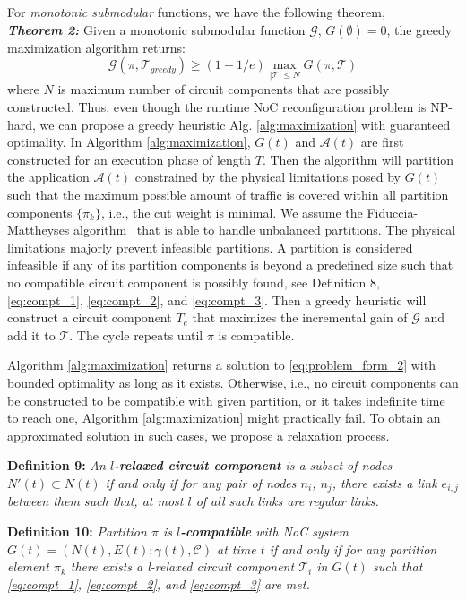 {{\noindent For \textit{monotonic submodular} functions\cite{nemhauser1978best}, we have the following theorem,\\
\textbf{\textit{Theorem 2:}} 
Given a monotonic submodular function $\mathcal G$, $G(\emptyset)=0$, the greedy maximization algorithm returns:
\begin{equation}\label{eq:max}
 \mathcal G(\pi, \mathcal T_{greedy}) \geq (1-1/e) \max\limits_{|\mathcal T|\leq N}G(\pi,\mathcal T)
\end{equation}
where $N$ is maximum number of circuit components that are possibly constructed. Thus, even though the runtime NoC reconfiguration problem is NP-hard, we can propose a greedy heuristic Alg. \ref{alg:maximization} with guaranteed optimality. In Algorithm \ref{alg:maximization}, $G(t)$ and $\mathcal A(t)$ are first constructed for an execution phase of length $T$. Then the algorithm will partition the application $\mathcal A(t)$ constrained by the physical limitations posed by $G(t)$ such that the maximum possible amount of traffic is covered within all partition components $\{\pi_{k}\}$, i.e., the cut weight is minimal. We assume the Fiduccia-Mattheyses algorithm~\cite{fiduccia1982linear} that is able to handle unbalanced partitions. The physical limitations majorly prevent infeasible partitions. A partition is considered infeasible if any of its partition components is beyond a predefined size such that no compatible circuit component is possibly found, see Definition 8, \eqref{eq:compt_1}, \eqref{eq:compt_2}, and \eqref{eq:compt_3}. Then a greedy heuristic will construct a circuit component $T_{e}$ that maximizes the incremental gain of $\mathcal G$ and add it to $\mathcal T$. The cycle repeats until $\pi$ is compatible. 

Algorithm \ref{alg:maximization} returns a solution to \eqref{eq:problem_form_2} with bounded optimality as long as it exists. Otherwise, i.e., no circuit components can be constructed to be compatible with given partition, or it takes indefinite time to reach one, Algorithm \ref{alg:maximization} might practically fail. To obtain an approximated solution in such cases, we propose a relaxation process.

\noindent \textbf{Definition 9:}\label{def:relax_1} \textit{ An \textbf{$l$-relaxed circuit component} is a subset of nodes $N'(t) \subset N(t)$ if and only if for any pair of nodes $n_i$, $n_j$, there exists a link $e_{i,j}$ between them such that,  at most $l$ of all such links are regular links.}

\noindent \textbf{Definition 10:}\label{def:relax_2} \textit{ Partition $\pi$ is \textbf{$l$-compatible} with NoC system $G(t)=(N(t),E(t);\gamma(t),\mathcal C)$ at time $t$ if and only if for any partition element $\pi_{k}$ there exists a l-relaxed circuit component $\mathcal T_{i}$ in $G(t)$ such that \eqref{eq:compt_1}, \eqref{eq:compt_2}, and \eqref{eq:compt_3} are met. }

}}
